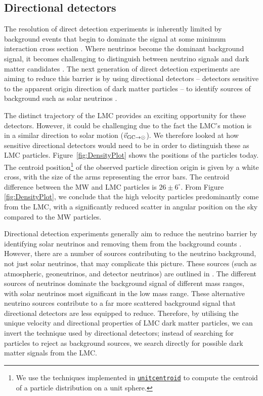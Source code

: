 \documentclass[fleqn,usenatbib]{mnras}
\begin{document}
\subsection{Directional detectors}
The resolution of direct detection experiments is inherently limited by background events that begin to dominate the signal at some minimum interaction cross section \citep{Gonzalez_Garcia_2018}. Where neutrinos become the dominant background signal, it becomes challenging to distinguish between neutrino signals and dark matter candidates \citep[][]{Boehm_2019}. The next generation of direct detection experiments are aiming to reduce this barrier is by using directional detectors -- detectors sensitive to the apparent origin direction of dark matter particles -- to identify sources of background such as solar neutrinos \citep{Akimov_2020}. 

The distinct trajectory of the LMC provides an exciting opportunity for these detectors. However, it could be challenging due to the fact the LMC's motion is in a similar direction to solar motion ($\vec{v}_{{\rm GC}\to\rm \odot}$). We therefore looked at how sensitive directional detectors would need to be in order to distinguish these as LMC particles. Figure~\ref{fig:DensityPlot} shows the positions of the particles today. The centroid position\footnote{We use the techniques implemented in \href{https://github.com/michael-petersen/unitcentroid}{{\tt unitcentroid}} to compute the centroid of a particle distribution on a unit sphere.} of the observed particle direction origin is given by a white cross, with the size of the arms representing the error bars. The centroid difference between the MW and LMC particles is $26\pm6 ^\circ$. From Figure \ref{fig:DensityPlot}, we conclude that the high velocity particles predominantly come from the LMC, with a significantly reduced scatter in angular position on the sky compared to the MW particles.

Directional detection experiments generally aim to reduce the neutrino barrier by identifying solar neutrinos and removing them from the background counts \citep{Grothaus_2014}. However, there are a number of sources contributing to the neutrino background, not just solar neutrinos, that may complicate this picture. These sources (such as atmospheric, geoneutrinos, and detector neutrinos) are outlined in \citet{O_Hare_2020}. The different sources of neutrinos dominate the background signal of different mass ranges, with solar neutrinos most significant in the low mass range. These alternative neutrino sources contribute to a far more scattered background signal that directional detectors are less equipped to reduce. Therefore, by utilising the unique velocity and directional properties of LMC dark matter particles, we can invert the technique used by directional detectors; instead of searching for particles to reject as background sources, we search directly for possible dark matter signals from the LMC.
\end{document}
